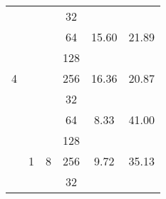 \begin{longtable}{cccccc}
                      & \cellcolor[HTML]{EFEFEF}{  }                    & \cellcolor[HTML]{EFEFEF}{  }                    & \cellcolor[HTML]{EFEFEF}32                      & \cellcolor[HTML]{EFEFEF}{  17.99}    & \cellcolor[HTML]{EFEFEF}{  18.98}    \\
                      & \cellcolor[HTML]{EFEFEF}{  }                    & \cellcolor[HTML]{EFEFEF}{  }                    & 64                                              & {  15.60}                            & {  21.89}                            \\
                      & \cellcolor[HTML]{EFEFEF}{  }                    & \cellcolor[HTML]{EFEFEF}{  }                    & \cellcolor[HTML]{EFEFEF}128                     & \cellcolor[HTML]{EFEFEF}{  15.45}    & \cellcolor[HTML]{EFEFEF}{  22.10}    \\
\multirow{-12}{*}{4}  & \multirow{-4}{*}{\cellcolor[HTML]{EFEFEF}{  4}} & \multirow{-4}{*}{\cellcolor[HTML]{EFEFEF}{  1}} & 256                                             & {  16.36}                            & {  20.87}                            \\ \hline
                      & {  }                                            & {  }                                            & \cellcolor[HTML]{EFEFEF}32                      & \cellcolor[HTML]{EFEFEF}{  9.07}     & \cellcolor[HTML]{EFEFEF}{  37.63}    \\
                      & {  }                                            & {  }                                            & 64                                              & {  8.33}                             & {  41.00}                            \\
                      & {  }                                            & {  }                                            & \cellcolor[HTML]{EFEFEF}128                     & \cellcolor[HTML]{EFEFEF}{  8.62}     & \cellcolor[HTML]{EFEFEF}{  39.63}    \\
                      & \multirow{-4}{*}{{  1}}                         & \multirow{-4}{*}{{  8}}                         & 256                                             & {  9.72}                             & {  35.13}                            \\ \cline{2-6}
                      & \cellcolor[HTML]{EFEFEF}{  }                    & \cellcolor[HTML]{EFEFEF}{  }                    & \cellcolor[HTML]{EFEFEF}32                      & \cellcolor[HTML]{EFEFEF}{  9.02}     & \cellcolor[HTML]{EFEFEF}{  37.86}    \\

\end{longtable}
